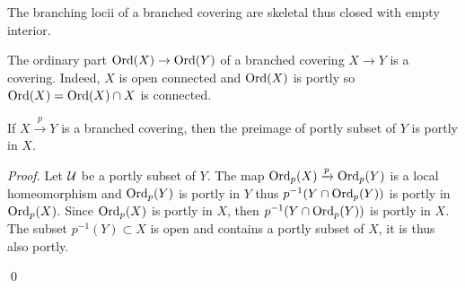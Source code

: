  \begin{rem}\label{rem:branching_locii_branched_covering} The branching locii of a branched covering are skeletal thus closed with empty interior.
 \end{rem}
\begin{rem}\label{rem:ordinary_part_branched_covering}
 The ordinary part $\mathrm{Ord}(X)\rightarrow \mathrm{Ord}(Y)$ of a branched covering $X\rightarrow Y$ is a covering. Indeed, $X$ is open connected and $\mathrm{Ord}(X)$ is portly so $\mathrm{Ord}(X)=\mathrm{Ord}(X)\cap X$ is connected. 
\end{rem}
\begin{lem}\label{lem:portly_preimage_branched} If $X\xrightarrow{p} Y$ is a branched covering, then the preimage of  portly subset of $Y$ is portly in $X$.
\end{lem}
\begin{proof} Let $\mathcal{U}$ be a portly subset of $Y$.
The map $\mathrm{Ord}_p(X) \xrightarrow{p} \mathrm{Ord}_p(Y)$ is a local homeomorphism  and $\mathrm{Ord}_p(Y)$ is portly in $Y$ thus $p^{-1}(Y\cap \mathrm{Ord}_p(Y))$ is portly in $\mathrm{Ord}_p(X)$. Since $\mathrm{Ord}_p(X)$ is portly in $X$, then $p^{-1}(Y\cap \mathrm{Ord}_p(Y))$ is portly in $X$. 
The subset $p^{-1}(Y)\subset X$ is open and contains a portly subset of $X$, it is thus also portly.
 
\qed\end{proof}



